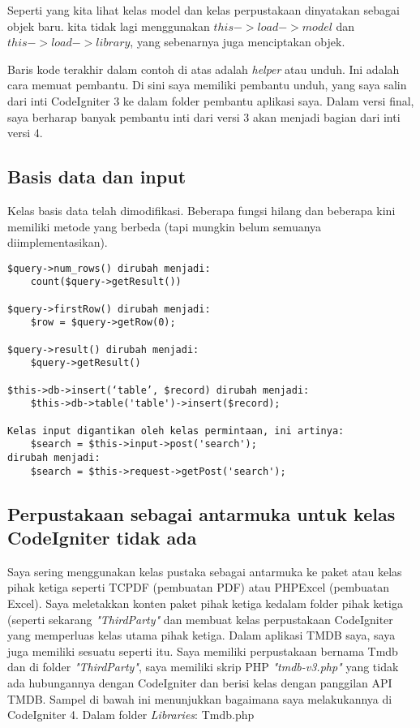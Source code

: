 \par
Seperti yang kita lihat kelas model dan kelas perpustakaan dinyatakan sebagai objek baru. kita tidak lagi menggunakan $ this-> load-> model $ dan $ this-> load-> library $, yang sebenarnya juga menciptakan objek.
\par
Baris kode terakhir dalam contoh di atas adalah \textit{helper} atau unduh. Ini adalah cara memuat pembantu. Di sini saya memiliki pembantu unduh, yang saya salin dari inti CodeIgniter 3 ke dalam folder pembantu aplikasi saya. Dalam versi final, saya berharap banyak pembantu inti dari versi 3 akan menjadi bagian dari inti versi 4.

\subsection{Basis data dan input}
Kelas basis data telah dimodifikasi. Beberapa fungsi hilang dan beberapa kini memiliki metode yang berbeda (tapi mungkin belum semuanya diimplementasikan).

\begin{verbatim}
$query->num_rows() dirubah menjadi:
    count($query->getResult())

$query->firstRow() dirubah menjadi:
    $row = $query->getRow(0);

$query->result() dirubah menjadi:
    $query->getResult()

$this->db->insert(‘table’, $record) dirubah menjadi:
    $this->db->table('table')->insert($record);

Kelas input digantikan oleh kelas permintaan, ini artinya:
    $search = $this->input->post('search');
dirubah menjadi:
    $search = $this->request->getPost('search');
\end{verbatim}

\subsection{Perpustakaan sebagai antarmuka untuk kelas CodeIgniter tidak ada}
Saya sering menggunakan kelas pustaka sebagai antarmuka ke paket atau kelas pihak ketiga seperti TCPDF (pembuatan PDF) atau PHPExcel (pembuatan Excel). Saya meletakkan konten paket pihak ketiga kedalam folder pihak ketiga (seperti sekarang \textit{"ThirdParty"} dan membuat kelas perpustakaan CodeIgniter yang memperluas kelas utama pihak ketiga. Dalam aplikasi TMDB saya, saya juga memiliki sesuatu seperti itu. Saya memiliki perpustakaan bernama Tmdb dan di folder \textit{"ThirdParty"}, saya memiliki skrip PHP \textit{"tmdb-v3.php"} yang tidak ada hubungannya dengan CodeIgniter dan berisi kelas dengan panggilan API TMDB. Sampel di bawah ini menunjukkan bagaimana saya melakukannya di CodeIgniter 4. Dalam folder \textit{Libraries}: Tmdb.php

